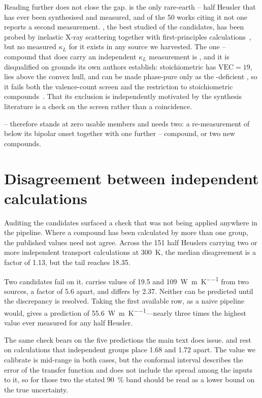 \documentclass[preprint, 12pt]{elsarticle}
\begin{document}
Reading further does not close the gap.  is the only rare-earth -- half
Heusler that has ever been synthesised and measured, and of the \num{50} works citing it not one
reports a second measurement. , the best studied of the candidates, has been probed by
inelastic X-ray scattering together with first-principles calculations~\cite{li2024multiphono}, but
no measured $\kappa_L$ for it exists in any source we harvested. The one -- compound
that does carry an independent $\kappa_L$ measurement is , and it is disqualified on
grounds its own authors establish: stoichiometric  has $\mathrm{VEC}=19$, lies above the
convex hull, and can be made phase-pure only as the -deficient , so it fails
both the valence-count screen and the restriction to stoichiometric
compounds~\cite{ren2023vacancymed,liu2025stabilizat}. That its exclusion is independently motivated
by the synthesis literature is a check on the screen rather than a coincidence.

-- therefore stands at zero usable members and needs two: a re-measurement of
 below its bipolar onset together with one further -- compound, or two new
compounds.

\section{Disagreement between independent calculations}
\label{sec:spread}

Auditing the candidates surfaced a check that was not being applied anywhere in the pipeline. Where
a compound has been calculated by more than one group, the published values need not agree. Across
the \num{151} half Heuslers carrying two or more independent transport calculations at
\SI{300}{\kelvin}, the median disagreement is a factor of \num{1.13}, but the tail reaches
\num{18.35}.

Two candidates fail on it.  carries values of \num{19.5} and
\SI{109}{\watt\per\meter\per\kelvin} from two sources, a factor of \num{5.6} apart, and
 differs by \num{2.37}. Neither can be predicted until the discrepancy is resolved.
Taking the first available row, as a naive pipeline would, gives a  prediction of
\SI{55.6}{\watt\per\meter\per\kelvin}---nearly three times the highest value ever measured for any
half Heusler.

The same check bears on the five predictions the main text does issue.  and 
rest on calculations that independent groups place \num{1.68} and \num{1.72} apart. The value we
calibrate is mid-range in both cases, but the conformal interval describes the error of the transfer
function and does not include the spread among the inputs to it, so for those two the stated
\SI{90}{\percent} band should be read as a lower bound on the true uncertainty.
\end{document}
